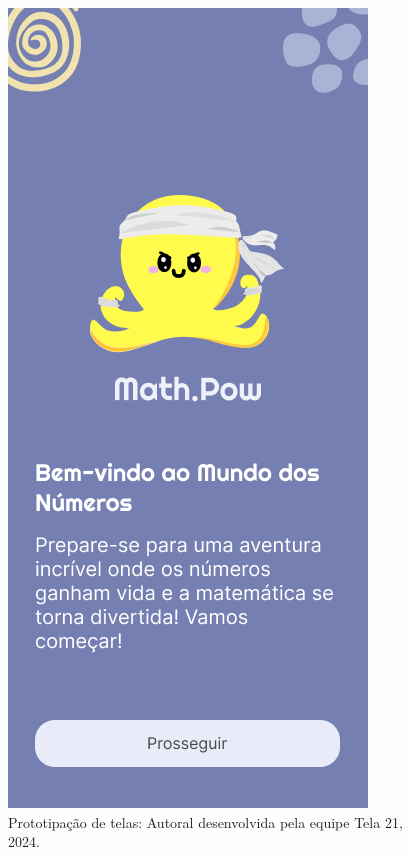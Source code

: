 \documentclass[12pt, openany, oneside, a4paper, english, brazil]{abntex2}   %
\begin{document}
\begin{figure}
    \centering
    \includegraphics[scale=0.7]{figuras/Math.Pow App/Welcome.png}
    \caption{Prototipação de telas: Autoral desenvolvida pela equipe Tela 21, 2024.}
    \label{fig:nome-da-imagem}
\end{figure}
\end{document}
